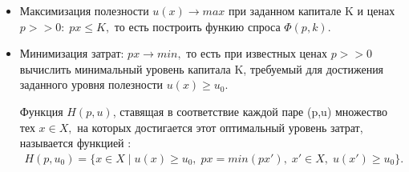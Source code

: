 \begin{itemize}
	\item Максимизация полезности $u(x) \rightarrow max$ при заданном капитале K и ценах $p >> 0: \; px \leq K,$ то есть построить функию спроса $\Phi(p, k)$.
	\item Минимизация затрат: $px \rightarrow min,$ то есть при известных ценах $p >> 0$ вычислить минимальный уровень капитала K, требуемый для достижения заданного уровня полезности $u(x) \geq u_0.$ 

	\vspace{1cm}\begin{definition}
		Функция $H(p,u)$, ставящая в соответствие каждой паре (p,u) множество тех $x \in X,$ на которых достигается этот оптимальный уровень затрат, называется функцией :
		\begin{gather*}
			H(p,u_0) = \{ x \in X \mid u(x) \geq u_0, \; px = min (px'), \; x' \in X, \; u(x') \geq u_0\}.
		\end{gather*}
	\end{definition}

\end{itemize}